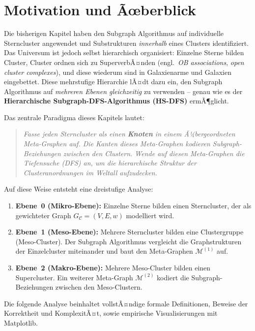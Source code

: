 ﻿\documentclass[a4paper,12pt]{report}
\theoremstyle{definition}
\begin{document}
\section{Motivation und Ãœberblick}
\label{ssec:hsdfs_motivation}

Die bisherigen Kapitel haben den Subgraph Algorithmus auf individuelle Sterncluster angewendet und Substrukturen \emph{innerhalb} eines Clusters identifiziert. Das Universum ist jedoch selbst hierarchisch organisiert: Einzelne Sterne bilden Cluster, Cluster ordnen sich zu SuperverbÃ¤nden (engl.\ \emph{OB associations}, \emph{open cluster complexes}), und diese wiederum sind in Galaxienarme und Galaxien eingebettet. Diese mehrstufige Hierarchie lÃ¤dt dazu ein, den Subgraph Algorithmus auf \emph{mehreren Ebenen gleichzeitig} zu verwenden -- genau wie es der \textbf{Hierarchische Subgraph-DFS-Algorithmus (HS-DFS)} \cite{epp2026msubgraph} ermÃ¶glicht.

\medskip

Das zentrale Paradigma dieses Kapitels lautet:
\begin{quote}
\emph{Fasse jeden Sterncluster als einen \textbf{Knoten} in einem Ã¼bergeordneten
Meta-Graphen auf. Die Kanten dieses Meta-Graphen kodieren Subgraph-Beziehungen
zwischen den Clustern. Wende auf diesen Meta-Graphen die Tiefensuche (DFS) an,
um die hierarchische Struktur der Clusteranordnungen im Weltall aufzudecken.}
\end{quote}

Auf diese Weise entsteht eine dreistufige Analyse:
\begin{enumerate}
    \item \textbf{Ebene~0 (Mikro-Ebene):} Einzelne Sterne bilden einen Sterncluster, der als gewichteter Graph $G_\mathcal{C} = (V, E, w)$ modelliert wird.
    \item \textbf{Ebene~1 (Meso-Ebene):} Mehrere Sterncluster bilden eine Clustergruppe (Meso-Cluster). Der Subgraph Algorithmus vergleicht die Graphstrukturen der Einzelcluster miteinander und baut den Meta-Graphen $\mathcal{M}^{(1)}$ auf.
    \item \textbf{Ebene~2 (Makro-Ebene):} Mehrere Meso-Cluster bilden einen Supercluster. Ein weiterer Meta-Graph $\mathcal{M}^{(2)}$ kodiert die Subgraph-Beziehungen zwischen den Meso-Clustern.
\end{enumerate}

Die folgende Analyse beinhaltet vollstÃ¤ndige formale Definitionen, Beweise der Korrektheit und KomplexitÃ¤t, sowie empirische Visualisierungen mit Matplotlib.
\end{document}
